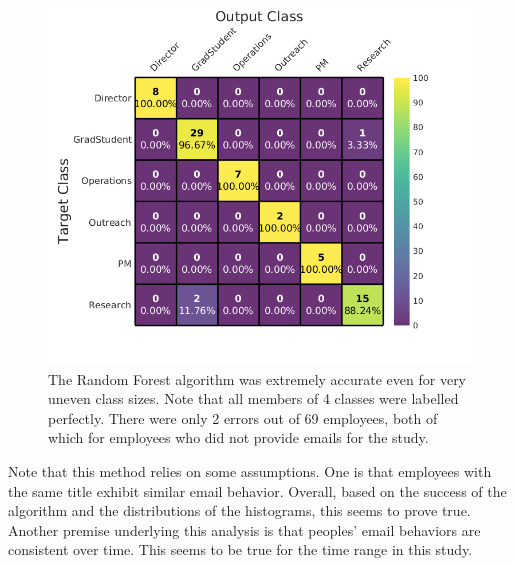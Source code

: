 \documentclass[10pt,twocolumn,conference]{IEEEtran}
\begin{document}
\begin{figure}[t]
    \centering
    \includegraphics[width=\columnwidth,trim={1mm 2mm 1mm 3mm},clip]{Classification_confusion}
    \vspace{-20pt}
    \caption{The Random Forest algorithm was extremely accurate even for very uneven class sizes.  Note that all members of 4 classes were labelled perfectly.  There were only 2 errors out of 69 employees, both of which for employees who did not provide emails for the study.}
    \label{fig:result_hist}
\end{figure}

Note that this method relies on some assumptions.  One is that employees with the same title exhibit similar email behavior.  Overall, based on the success of the algorithm and the distributions of the histograms, this seems to prove true.  Another premise underlying this analysis is that peoples' email behaviors are consistent over time.  This seems to be true for the time range in this study.
\end{document}
